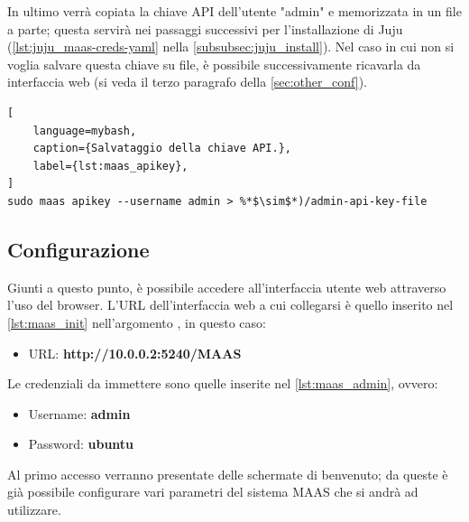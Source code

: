 \bigskip \noindent
In ultimo verrà copiata la chiave API dell'utente "admin" e memorizzata in un file a parte;
% 
questa servirà nei passaggi successivi per l'installazione di Juju (\cref{lst:juju_maas-creds-yaml} nella \cref{subsubsec:juju_install}).
% 
Nel caso in cui non si voglia salvare questa chiave su file, è possibile successivamente ricavarla da interfaccia web (si veda il terzo paragrafo della \cref{sec:other_conf}).
% 
\begin{lstlisting}[
    language=mybash, 
    caption={Salvataggio della chiave API.}, 
    label={lst:maas_apikey},
]
sudo maas apikey --username admin > %*$\sim$*)/admin-api-key-file
\end{lstlisting}
% 

\bigskip\noindent


\subsection{Configurazione}\label{subsubsec:maas_conf}
% 
Giunti a questo punto, è possibile accedere all'interfaccia utente web attraverso l'uso del browser.
% 
L'URL dell'interfaccia web a cui collegarsi è quello inserito nel \cref{lst:maas_init} nell'argomento , in questo caso:
% 
\begin{itemize}
    \item[]URL: \textbf{http://10.0.0.2:5240/MAAS}
\end{itemize}
% 
Le credenziali da immettere sono quelle inserite nel \cref{lst:maas_admin}, ovvero:
% 
\begin{itemize}
    \item[]Username: \textbf{admin}

    \item[]Password: \textbf{ubuntu}
\end{itemize}

\bigskip \noindent
Al primo accesso verranno presentate delle schermate di benvenuto;
% 
da queste è già possibile configurare vari parametri del sistema MAAS che si andrà ad utilizzare.

